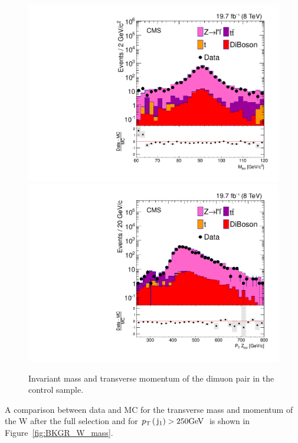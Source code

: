 \begin{figure}[!Hhtb]
  \begin{center}
  \includegraphics[scale=0.39]{Figures/sus13009/cut/ZleplepMT_60_120.pdf}
  \includegraphics[scale=0.39]{Figures/sus13009/cut/ZleplepPT_60_120.pdf}
  \caption{Invariant mass and transverse momentum of the dimuon pair in the \zmumu control sample.}
  \label{fig:BKGR_Z_mass}
  \end{center}
\end{figure}

A comparison between data and MC for the transverse mass and momentum of the W after the full selection and for $p_{\text{T}}\,(\,\mathrm{j}_1) > 250 \mathrm{GeV}\,$ is shown in Figure~\ref{fig:BKGR_W_mass}.%

